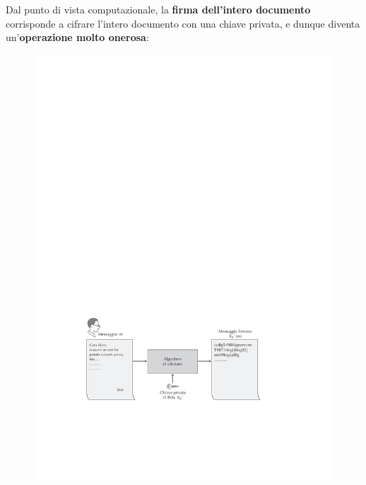 \documentclass[a4paper]{article}
\begin{document}
	\noindent
	Dal punto di vista computazionale, la \textbf{firma dell'intero documento} corrisponde a cifrare l'intero documento con una chiave privata, e dunque diventa un'\textbf{operazione molto onerosa}:
	\begin{figure}[!htp]
		\centering
		\includegraphics[width=\textwidth]{img/int-aut_e_autor/firma_documento-oneroso.pdf}
	\end{figure}
	
\end{document}
